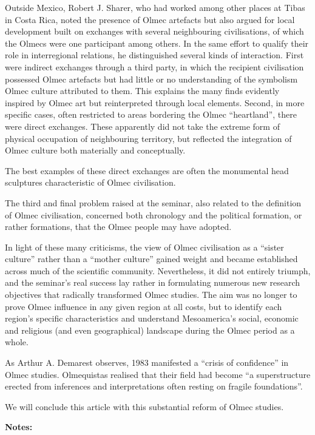 \documentclass[11pt,a4paper]{article}
\begin{document}
Outside Mexico, Robert J. Sharer, who had worked among other places at Tibas in Costa Rica, noted the presence of Olmec artefacts but also argued for local development built on exchanges with several neighbouring civilisations, of which the Olmecs were one participant among others. In the same effort to qualify their role in interregional relations, he distinguished several kinds of interaction. First were indirect exchanges through a third party, in which the recipient civilisation possessed Olmec artefacts but had little or no understanding of the symbolism Olmec culture attributed to them. This explains the many finds evidently inspired by Olmec art but reinterpreted through local elements. Second, in more specific cases, often restricted to areas bordering the Olmec ``heartland'', there were direct exchanges. These apparently did not take the extreme form of physical occupation of neighbouring territory, but reflected the integration of Olmec culture both materially and conceptually.

The best examples of these direct exchanges are often the monumental head sculptures characteristic of Olmec civilisation.

The third and final problem raised at the seminar, also related to the definition of Olmec civilisation, concerned both chronology and the political formation, or rather formations, that the Olmec people may have adopted.

In light of these many criticisms, the view of Olmec civilisation as a ``sister culture'' rather than a ``mother culture'' gained weight and became established across much of the scientific community. Nevertheless, it did not entirely triumph, and the seminar's real success lay rather in formulating numerous new research objectives that radically transformed Olmec studies. The aim was no longer to prove Olmec influence in any given region at all costs, but to identify each region's specific characteristics and understand Mesoamerica's social, economic and religious (and even geographical) landscape during the Olmec period as a whole.

As Arthur A. Demarest observes, 1983 manifested a ``crisis of confidence'' in Olmec studies. Olmequistas realised that their field had become ``a superstructure erected from inferences and interpretations often resting on fragile foundations''.

We will conclude this article with this substantial reform of Olmec studies.

\textbf{Notes:}
\end{document}
